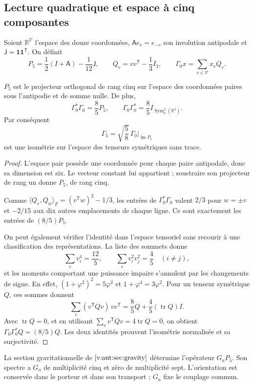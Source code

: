 \subsection{Lecture quadratique et espace à cinq composantes}
Soient \(\mathbb R^{\mathcal V}\) l'espace des douze coordonnées,
\(\mathsf A e_v=e_{-v}\) son involution antipodale et
\(\mathsf J=\mathbf1\mathbf1^{\mathsf T}\). On définit
\[
 P_5=\frac12(I+\mathsf A)-\frac1{12}\mathsf J,\qquad
 Q_v=vv^{\mathsf T}-\frac13I_3,\qquad
 \Gamma_0x=\sum_{v\in\mathcal V}x_vQ_v.
\]
\begin{theorem}
\label{vii:thm:portador-pentacomponente}
\(P_5\) est le projecteur orthogonal de rang cinq sur l'espace des
coordonnées paires sous l'antipodie et de somme nulle. De plus,
\[
 \Gamma_0^*\Gamma_0=\frac85P_5,\qquad
 \Gamma_0\Gamma_0^*=\frac85I_{\operatorname{Sym}^2_0(\mathbb R^3)}.
\]
Par conséquent
\[
 \Gamma_5=\sqrt{\frac58}\,\Gamma_0|_{\operatorname{im}P_5}
\]
est une isométrie sur l'espace des tenseurs symétriques sans trace.
\end{theorem}
\begin{proof}
L'espace pair possède une coordonnée pour chaque paire antipodale, donc
sa dimension est six. Le vecteur constant lui appartient ; soustraire son
projecteur de rang un donne \(P_5\), de rang cinq.

Comme
\(\langle Q_v,Q_w\rangle_F=(v^{\mathsf T}w)^2-1/3\), les entrées
de \(\Gamma_0^*\Gamma_0\) valent \(2/3\) pour \(w=\pm v\) et
\(-2/15\) aux dix autres emplacements de chaque ligne. Ce sont
exactement les entrées de \((8/5)P_5\).

On peut également vérifier l'identité dans l'espace tensoriel sans recourir à une classification des représentations. La liste des sommets donne
\[
 \sum_vv_i^4=\frac{12}{5},\qquad
 \sum_vv_i^2v_j^2=\frac45\quad(i\ne j),
\]
et les moments comportant une puissance impaire s'annulent par les changements de signe. En effet, \((1+\varphi^2)^2=5\varphi^2\) et \(1+\varphi^4=3\varphi^2\). Pour un tenseur symétrique \(Q\), ces sommes donnent
\[
 \sum_v(v^{\mathsf T}Qv)\,vv^{\mathsf T}
 =\frac85Q+\frac45(\operatorname{tr}Q)I.
\]
Avec \(\operatorname{tr}Q=0\), et en utilisant
\(\sum_vv^{\mathsf T}Qv=4\operatorname{tr}Q=0\), on obtient
\(\Gamma_0\Gamma_0^*Q=(8/5)Q\). Les deux identités prouvent
l'isométrie normalisée et sa surjectivité.
\end{proof}

La section gravitationnelle de \(\ref{v:ant:sec:gravity}\) détermine
l’opérateur \(G_aP_5\). Son spectre a \(G_a\) de multiplicité
cinq et zéro de multiplicité sept. L’orientation est conservée dans
le porteur et dans son transport ; \(G_a\) fixe le couplage commun.

